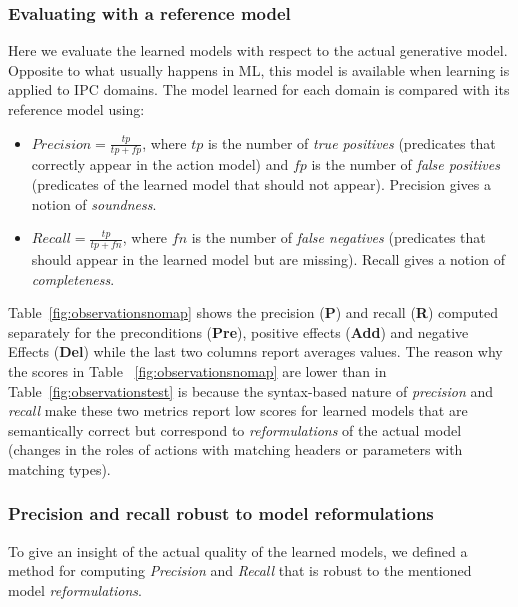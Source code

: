 \documentclass[3p,times]{elsarticle}
\begin{document}
\subsubsection{Evaluating with a reference model}

Here we evaluate the learned models with respect to the actual generative model. Opposite to what usually happens in ML, this model is available when learning is applied to IPC domains. The model learned for each domain is compared with its reference model using:

\begin{itemize}
\item $Precision=\frac{tp}{tp+fp}$, where $tp$ is the number of {\em true positives} (predicates that correctly appear in the action model) and $fp$ is the number of {\em false positives} (predicates of the learned model that should not appear). Precision gives a notion of {\em soundness}.
\item $Recall=\frac{tp}{tp+fn}$, where $fn$ is the number of {\em false negatives} (predicates that should appear in the learned model but are missing). Recall gives a notion of {\em completeness}.
\end{itemize}

Table~\ref{fig:observationsnomap} shows the precision ({\bf P}) and recall ({\bf R}) computed separately for the preconditions ({\bf Pre}), positive effects ({\bf Add}) and negative Effects ({\bf Del}) while the last two columns report averages values. The reason why the scores in Table ~\ref{fig:observationsnomap} are lower than in Table~\ref{fig:observationstest} is because the syntax-based nature of {\em precision} and {\em recall} make these two metrics report low scores for learned models that are semantically correct but correspond to {\em reformulations} of the actual model (changes in the roles of actions with matching headers or parameters with matching types).


\subsubsection{Precision and recall robust to model reformulations}

To give an insight of the actual quality of the learned models, we defined a method for computing {\em Precision} and {\em Recall} that is robust to the mentioned model {\em reformulations}.
\end{document}
